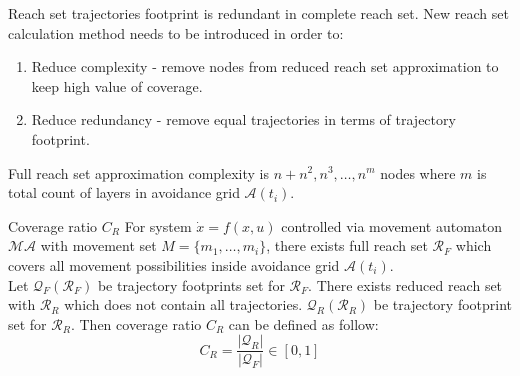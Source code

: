 \noindent Reach set trajectories footprint is redundant in complete reach set. New reach set calculation method needs to be introduced in order to:
\begin{enumerate}
    \item Reduce complexity - remove nodes from reduced reach set approximation to keep high value of coverage. 
    \item Reduce redundancy - remove equal trajectories in terms of trajectory footprint.
\end{enumerate}


\noindent Full reach set approximation complexity is $n + n^2, n^3, \dots, n^m$ nodes where $m$ is total count of layers in avoidance grid $\mathscr{A}(t_i)$. 
\begin{definition}{Coverage ratio $C_R$} For system $\dot{x}=f(x,u)$ controlled via movement automaton $\mathscr{MA}$ with movement set $M=\{m_1,\dots,m_i\}$, there exists full reach set $\mathscr{R}_F$ which covers all movement possibilities inside avoidance grid $\mathscr{A}(t_i)$. \\
\noindent Let $\mathscr{Q}_F(\mathscr{R}_F)$ be trajectory footprints set for $\mathscr{R}_F$. There exists reduced reach set with $\mathscr{R}_R$ which does not contain all trajectories. $\mathscr{Q}_R(\mathscr{R}_R)$ be trajectory footprint set for $\mathscr{R}_R$. Then coverage ratio  $C_R$ can be defined as follow:
\begin{equation}\label{eq:reachSetCoverageRatio}
    C_R = \frac{|\mathscr{Q}_R|}{|\mathscr{Q}_F|}\in [0,1]
\end{equation}
\end{definition}


